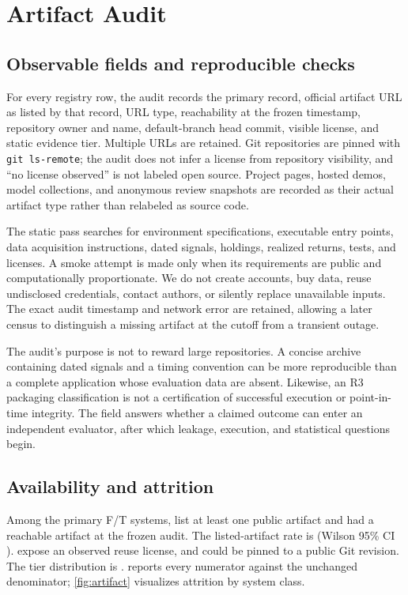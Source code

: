 \documentclass[11pt]{article}
\begin{document}
\section{Artifact Audit}\label{sec:artifacts}

\subsection{Observable fields and reproducible checks}

For every registry row, the audit records the primary record, official artifact URL as listed by that record, URL type, reachability at the frozen timestamp, repository owner and name, default-branch head commit, visible license, and static evidence tier. Multiple URLs are retained. Git repositories are pinned with \texttt{git ls-remote}; the audit does not infer a license from repository visibility, and ``no license observed'' is not labeled open source. Project pages, hosted demos, model collections, and anonymous review snapshots are recorded as their actual artifact type rather than relabeled as source code.

The static pass searches for environment specifications, executable entry points, data acquisition instructions, dated signals, holdings, realized returns, tests, and licenses. A smoke attempt is made only when its requirements are public and computationally proportionate. We do not create accounts, buy data, reuse undisclosed credentials, contact authors, or silently replace unavailable inputs. The exact audit timestamp and network error are retained, allowing a later census to distinguish a missing artifact at the cutoff from a transient outage.

The audit's purpose is not to reward large repositories. A concise archive containing dated signals and a timing convention can be more reproducible than a complete application whose evaluation data are absent. Likewise, an R3 packaging classification is not a certification of successful execution or point-in-time integrity. The field answers whether a claimed outcome can enter an independent evaluator, after which leakage, execution, and statistical questions begin.

\subsection{Availability and attrition}

Among the \MethodSystemCount{} primary F/T systems, \ArtifactCountFT{} list at least one public artifact and \ReachableArtifactCountFT{} had a reachable artifact at the frozen audit. The listed-artifact rate is \ArtifactRateFT{} (Wilson 95\% CI \ArtifactWilsonFT{}). \LicensedArtifactCountFT{} expose an observed reuse license, and \PinnedRepoCountFT{} could be pinned to a public Git revision. The tier distribution is \ArtifactTierSummaryFT{}.  reports every numerator against the unchanged denominator; \cref{fig:artifact} visualizes attrition by system class.
\end{document}
